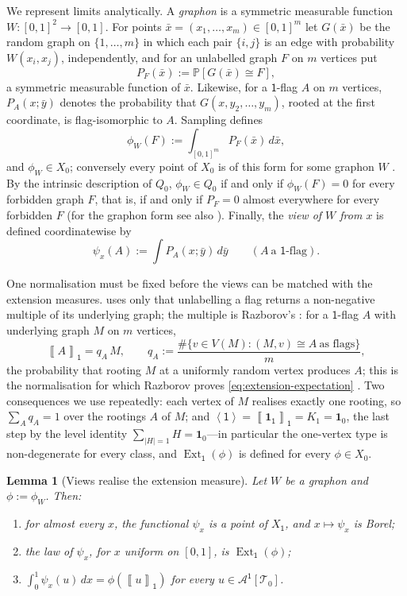 \documentclass[11pt]{article}
\newtheorem{lemma}[lemma]{Lemma}
\theoremstyle{definition}
\newcommand{\Prob}{\mathbb{P}}
\newcommand{\A}{\mathcal{A}}
\newcommand{\T}{\mathcal{T}}
\newcommand{\Ext}{\operatorname{Ext}}
\newcommand{\brak}[1]{\left\langle #1\right\rangle}
\newcommand{\avg}[2]{\left\llbracket #1 \right\rrbracket_{#2}}
\newcommand{\one}{\mathbf 1}
\newcommand{\vtype}{\mathsf{1}}
\begin{document}
We represent limits analytically.  A \emph{graphon} is a symmetric measurable function
$W\colon[0,1]^2\to[0,1]$.  For points $\bar x=(x_1,\dots,x_m)\in[0,1]^m$ let $G(\bar x)$
be the random graph on $\{1,\dots,m\}$ in which each pair $\{i,j\}$ is an edge with
probability $W(x_i,x_j)$, independently, and for an unlabelled graph $F$ on $m$ vertices
put
\[
  P_F(\bar x):=\Prob[G(\bar x)\cong F],
\]
a symmetric measurable function of $\bar x$.  Likewise, for a $\vtype$-flag $A$ on $m$
vertices, $P_A(x;\bar y)$ denotes the probability that $G(x,y_2,\dots,y_m)$, rooted at
the first coordinate, is flag-isomorphic to $A$.  Sampling defines
\[
  \phi_W(F):=\int_{[0,1]^m}P_F(\bar x)\,d\bar x ,
\]
and $\phi_W\in X_0$; conversely every point of $X_0$ is of this form for some graphon
$W$ \cite{LovaszSzegedy2006}.  By the intrinsic description of $Q_0$, $\phi_W\in Q_0$
if and only if $\phi_W(F)=0$ for every forbidden graph $F$, that is, if and only if
$P_F=0$ almost everywhere for every forbidden $F$ (for the graphon form see also
\cite{Janson2013}).  Finally, the \emph{view of $W$ from
$x$} is defined coordinatewise by
\[
  \psi_x(A):=\int P_A(x;\bar y)\,d\bar y
  \qquad(A\ \text{a $\vtype$-flag}).
\]

One normalisation must be fixed before the views can be matched with the extension
measures.   uses only that unlabelling a flag returns a
non-negative multiple of its underlying graph; the multiple is Razborov's
\cite[\S2.2]{Razborov2007}: for a $\vtype$-flag $A$ with underlying graph $M$ on $m$
vertices,
\[
  \avg{A}{\vtype}=q_A\,M,
  \qquad
  q_A:=\frac{\#\{v\in V(M):(M,v)\cong A\ \text{as flags}\}}{m},
\]
the probability that rooting $M$ at a uniformly random vertex produces $A$; this is
the normalisation for which Razborov proves \eqref{eq:extension-expectation}
\cite[Theorems 3.5, 3.12]{Razborov2007}.  Two consequences we use repeatedly: each
vertex of $M$ realises exactly one rooting, so $\sum_Aq_A=1$ over the rootings $A$ of
$M$; and $\brak\vtype=\avg{\one_\vtype}{\vtype}=K_1=\one_0$, the last step by the
level identity $\sum_{|H|=1}H=\one_0$---in particular the one-vertex type is
non-degenerate for every class, and $\Ext_{\vtype}(\phi)$ is defined for every
$\phi\in X_0$.

\begin{lemma}[Views realise the extension measure]\label{lem:rooting-law}
Let $W$ be a graphon and $\phi:=\phi_W$.  Then:
\begin{enumerate}[label=\textup{(\roman*)}, leftmargin=2.5em]
  \item\label{rl-hom} for almost every $x$, the functional $\psi_x$ is a point
  of $X_{\vtype}$, and $x\mapsto\psi_x$ is Borel;
  \item\label{rl-law} the law of $\psi_x$, for $x$ uniform on $[0,1]$, is
  $\Ext_{\vtype}(\phi)$;
  \item\label{rl-expectation} $\displaystyle\int_0^1\psi_x(u)\,dx
  =\phi(\avg{u}{\vtype})$ for every $u\in\A^{\vtype}[\T_0]$.
\end{enumerate}
\end{lemma}
\end{document}
